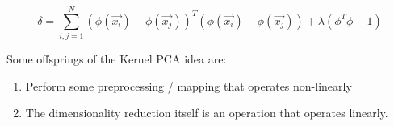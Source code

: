 
\begin{equation*}
    \delta = \sum_{i,j=1}^{N} (\phi(\vec{x_i}) - \phi(\vec{x_j}))^T (\phi(\vec{x_i}) - \phi(\vec{x_j})) + \lambda (\phi^T\phi-1)
\end{equation*}

Some offsprings of the Kernel PCA idea are:
\begin{enumerate}
    \item Perform some preprocessing / mapping that operates non-linearly
    \item The dimensionality reduction itself is an operation that operates linearly.
\end{enumerate}
